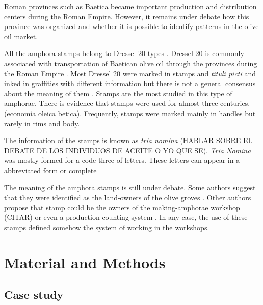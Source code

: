 \documentclass[review]{elsarticle}
\begin{document}
Roman provinces such as Baetica became important production and distribution centers during the Roman Empire. However, it remains under debate how this province was organized and whether it is possible to identify patterns in the olive oil market. 

 




All the amphora stamps belong to Dressel 20 types \citep{martin-kilcher_romischen_1994}. Dressel 20 is commonly associated with transportation of Baetican olive oil through the provinces during the Roman Empire \citep{berni_millet_epigrafianforica_2008}. Most Dressel 20 were marked in stamps and \textit{tituli picti} and inked in graffities with different information but there is not a general consensus about the meaning of them \citep{rodriguez_baetican_1998}. Stamps are the most studied in this type of amphorae. There is evidence that stamps were used for almost three centuries. (economía oleica betica). Frequently, stamps were marked mainly in handles but rarely in rims and body. 

The information of the stamps is known as \textit{tria nomina} (HABLAR SOBRE EL DEBATE DE LOS INDIVIDUOS DE ACEITE O YO QUE SE). \textit{Tria Nomina} was mostly formed for a code three of letters. These letters can appear in a abbreviated form or complete \citep{berni_millet_amphora_1996}

The meaning of the amphora stamps is still under debate. Some authors suggest that they were identified as the land-owners of the olive groves \citep{rodriguez_economioleicola_1977}. Other authors propose that stamp could be the owners of the making-amphorae workshop (CITAR) or even a production counting system \citep{berni_millet_epigrafianforica_2008}. In any case, the use of these stamps defined somehow the system of working in the workshops. 

\section{Material and Methods}

\subsection{Case study}
\end{document}
